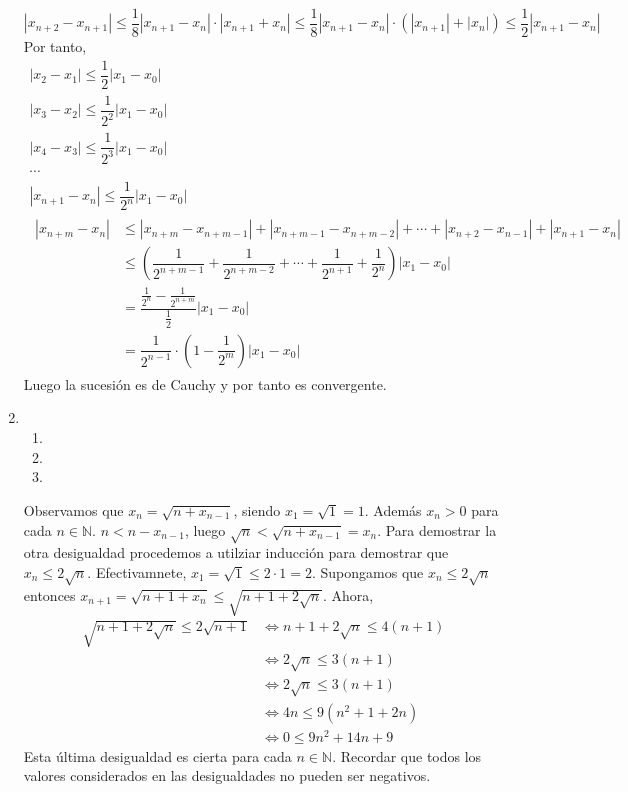\begin{enumerate}[label=\color{red}\textbf{\arabic*)}, leftmargin=*]
	\[ \left|x_{n+2}-x_{n+1}\right| \le\dfrac{1}{8}\left|x_{n+1}-x_n\right|\cdot\left|x_{n+1}+x_n\right|\le\dfrac{1}{8}\left|x_{n+1}-x_n\right|\cdot\left(\left|x_{n+1}\right|+\left|x_n\right|\right)\le\dfrac{1}{2}\left|x_{n+1}-x_{n}\right|\] Por tanto, \[ \begin{array}{c}
		|x_2-x_1|\le\dfrac{1}{2}|x_1-x_0|\\
		|x_3-x_2|\le\dfrac{1}{2^2}|x_1-x_0|\\
		|x_4-x_3|\le\dfrac{1}{2^3}|x_1-x_0|\\
		\cdots\\
		|x_{n+1}-x_n|\le\dfrac{1}{2^n}|x_1-x_0|\\
		\begin{aligned}
			|x_{n+m}-x_n|&\le|x_{n+m}-x_{n+m-1}|+|x_{n+m-1}-x_{n+m-2}|+\cdots+\left|x_{n+2}-x_{n-1}\right|+\left|x_{n+1}-x_n\right|\\
			&\le\left(\dfrac{1}{2^{n+m-1}}+\dfrac{1}{2^{n+m-2}}+\cdots+\dfrac{1}{2^{n+1}}+\dfrac{1}{2^n}\right)|x_1-x_0|\\
			&=\dfrac{\frac{1}{2^n}-\frac{1}{2^{n+m}}}{\frac{1}{2}}|x_1-x_0|\\
			&=\dfrac{1}{2^{n-1}}\cdot\left(1-\dfrac{1}{2^m}\right)|x_1-x_0|
		\end{aligned}
	\end{array} \] Luego la sucesión es de Cauchy y por tanto es convergente.
	\item {}
	\begin{enumerate}[label=\color{red}\arabic*)]
		\item {}
		\item {}
		\item {}
		\end{enumerate}	
		Observamos que $x_n=\sqrt{n+x_{n-1}}$, siendo $x_1=\sqrt{1}=1$. Además $x_n>0$ para cada $n\in\mathbb{N}$. $n<n-x_{n-1}$, luego $\sqrt{n}<\sqrt{n+x_{n-1}}=x_n$. Para demostrar la otra desigualdad procedemos a utilziar inducción	para demostrar que $x_n\le2\sqrt{n}$. Efectivamnete, $x_1=\sqrt{1}\le2\cdot1=2$. Supongamos que $x_n\le2\sqrt{n}$ entonces $x_{n+1}=\sqrt{n+1+x_n}\le\sqrt{n+1+2\sqrt{n}}$. Ahora, 
		\begin{align*}
			\sqrt{n+1+2\sqrt{n}}\le2\sqrt{n+1}&\Longleftrightarrow n+1+2\sqrt{n}\le4(n+1)\\
			&\Longleftrightarrow 2\sqrt{n}\le3(n+1)\\
			&\Longleftrightarrow2\sqrt{n}\le3(n+1)\\
			&\Longleftrightarrow4n\le9(n^2+1+2n)\\
			&\Longleftrightarrow0\le9n^2+14n+9
		\end{align*}
		Esta última desigualdad es cierta para cada $n\in\mathbb{N}$. Recordar que todos los valores considerados en las desigualdades no pueden ser negativos.
		

\end{enumerate}
